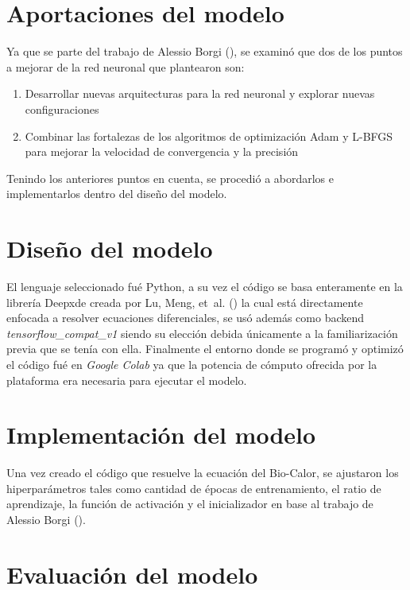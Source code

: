 \documentclass[
  spanish,
  us-letterpaper,
  DIV=11,
  numbers=noendperiod]{scrreprt}
\providecommand{\tightlist}{%
  \setlength{\itemsep}{0pt}\setlength{\parskip}{0pt}}
\begin{document}
\section{Aportaciones del modelo}\label{aportaciones-del-modelo}

Ya que se parte del trabajo de Alessio Borgi
(), se examinó que dos de los puntos a
mejorar de la red neuronal que plantearon son:

\begin{enumerate}
\def\labelenumi{\arabic{enumi}.}
\tightlist
\item
  Desarrollar nuevas arquitecturas para la red neuronal y explorar
  nuevas configuraciones
\item
  Combinar las fortalezas de los algoritmos de optimización Adam y
  L-BFGS para mejorar la velocidad de convergencia y la precisión
\end{enumerate}

Tenindo los anteriores puntos en cuenta, se procedió a abordarlos e
implementarlos dentro del diseño del modelo.

\section{Diseño del modelo}\label{diseuxf1o-del-modelo}

El lenguaje seleccionado fué Python, a su vez el código se basa
enteramente en la librería Deepxde creada por Lu, Meng, et~al.
() la cual está directamente enfocada a
resolver ecuaciones diferenciales, se usó además como backend
\emph{tensorflow\_compat\_v1} siendo su elección debida únicamente a la
familiarización previa que se tenía con ella. Finalmente el entorno
donde se programó y optimizó el código fué en \emph{Google Colab} ya que
la potencia de cómputo ofrecida por la plataforma era necesaria para
ejecutar el modelo.

\section{Implementación del modelo}\label{implementaciuxf3n-del-modelo}

Una vez creado el código que resuelve la ecuación del Bio-Calor, se
ajustaron los hiperparámetros tales como cantidad de épocas de
entrenamiento, el ratio de aprendizaje, la función de activación y el
inicializador en base al trabajo de Alessio Borgi
().

\section{Evaluación del modelo}\label{evaluaciuxf3n-del-modelo}
\end{document}
